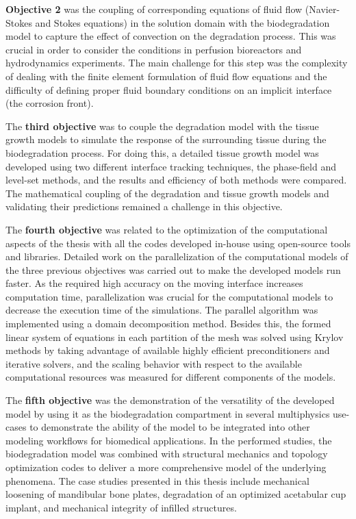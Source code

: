 \textbf{Objective 2} was the coupling of corresponding equations of fluid flow (Navier-Stokes and Stokes equations) in the solution domain with the biodegradation model to capture the effect of convection on the degradation process. This was crucial in order to consider the conditions in perfusion bioreactors and hydrodynamics experiments. The main challenge for this step was the complexity of dealing with the finite element formulation of fluid flow equations and the difficulty of defining proper fluid boundary conditions on an implicit interface (the corrosion front).

The \textbf{third objective} was to couple the degradation model with the tissue growth models to simulate the response of the surrounding tissue during the biodegradation process. For doing this, a detailed tissue growth model was developed using two different interface tracking techniques, the phase-field and level-set methods, and the results and efficiency of both methods were compared. The mathematical coupling of the degradation and tissue growth models and validating their predictions remained a challenge in this objective.

The \textbf{fourth objective} was related to the optimization of the computational aspects of the thesis with  all the codes developed in-house using open-source tools and libraries. Detailed work on the parallelization of the computational models of the three previous objectives was carried out to make the developed models run faster. As the required high accuracy on the moving interface increases computation time, parallelization was crucial for the computational models to decrease the execution time of the simulations. The parallel algorithm was implemented using a domain decomposition method. Besides this, the formed linear system of equations in each partition of the mesh was solved using Krylov methods by taking advantage of available highly efficient preconditioners and iterative solvers, and the scaling behavior with respect to the available computational resources was measured for different components of the models.

The \textbf{fifth objective} was the demonstration of the versatility of the developed model  by using it as the biodegradation compartment in several multiphysics  use-cases to demonstrate the ability of the model to be integrated into other modeling workflows for biomedical applications. In the performed studies, the biodegradation model was combined with structural mechanics and topology optimization codes to deliver a more comprehensive model of the underlying phenomena. The case studies presented in this thesis include mechanical loosening of mandibular bone plates, degradation of an optimized acetabular cup implant, and mechanical integrity of infilled structures.


